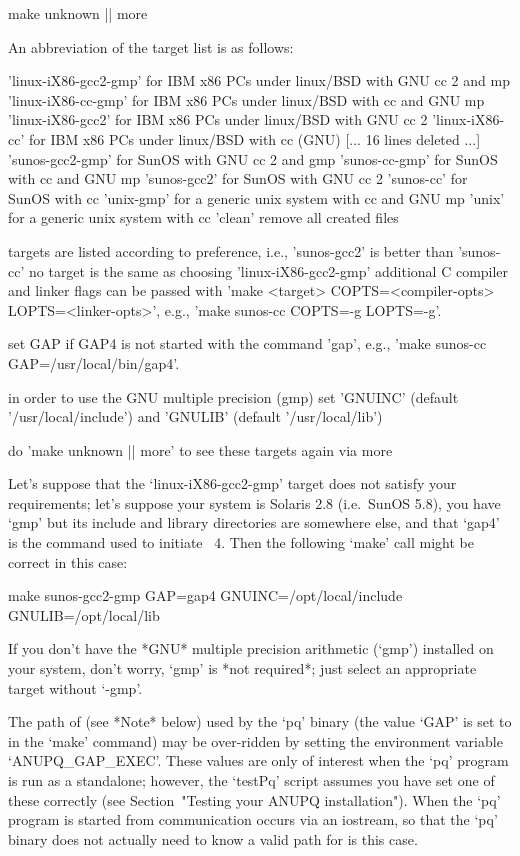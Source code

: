 \begintt
make unknown || more
\endtt

An abbreviation of the target list is as follows:

\begintt
'linux-iX86-gcc2-gmp'      for IBM x86 PCs under linux/BSD with GNU cc 2 and mp
'linux-iX86-cc-gmp'        for IBM x86 PCs under linux/BSD with cc and GNU mp
'linux-iX86-gcc2'          for IBM x86 PCs under linux/BSD with GNU cc 2
'linux-iX86-cc'            for IBM x86 PCs under linux/BSD with cc (GNU)
[... 16 lines deleted ...]
'sunos-gcc2-gmp'           for SunOS with GNU cc 2 and gmp
'sunos-cc-gmp'             for SunOS with cc and GNU mp
'sunos-gcc2'               for SunOS with GNU cc 2
'sunos-cc'                 for SunOS with cc
'unix-gmp'                 for a generic unix system with cc and GNU mp
'unix'                     for a generic unix system with cc
'clean'                    remove all created files

   targets are listed according to preference,
   i.e., 'sunos-gcc2' is better than 'sunos-cc'
   no target is the same as choosing 'linux-iX86-gcc2-gmp'
   additional C compiler and linker flags can be passed with
   'make <target> COPTS=<compiler-opts> LOPTS=<linker-opts>',
   e.g., 'make sunos-cc COPTS=-g LOPTS=-g'.

   set GAP if GAP4 is not started with the command 'gap',
   e.g., 'make sunos-cc GAP=/usr/local/bin/gap4'.

   in order to use the GNU multiple precision (gmp) set
   'GNUINC' (default '/usr/local/include') and 
   'GNULIB' (default '/usr/local/lib')

   do 'make unknown || more' to see these targets again via more
\endtt

Let's suppose that the `linux-iX86-gcc2-gmp' target does not satisfy your
requirements; let's suppose your system is Solaris 2.8 (i.e.~SunOS  5.8),
you have `gmp' but its include  and  library  directories  are  somewhere
else, and that `gap4' is the command used to initiate {\GAP}~4. Then  the
following `make' call might be correct in this case:

\begintt
make sunos-gcc2-gmp GAP=gap4 GNUINC=/opt/local/include GNULIB=/opt/local/lib
\endtt

If you  don't  have  the  *GNU*  multiple  precision  arithmetic  (`gmp')
installed on your system, don't worry,  `gmp'  is  *not  required*;  just
select an appropriate target without `-gmp'.

The path of {\GAP} (see *Note* below) used by the `pq' binary (the  value
`GAP' is set to in the `make' command) may be over-ridden by setting  the
environment variable `ANUPQ_GAP_EXEC'. These values are only of  interest
when the `pq' program is run  as  a  standalone;  however,  the  `testPq'
script assumes you have set one of these correctly (see  Section~"Testing
your ANUPQ installation"). When the `pq' program is started  from  {\GAP}
communication occurs via an iostream, so that the `pq'  binary  does  not
actually need to know a valid path for {\GAP} is this case.

